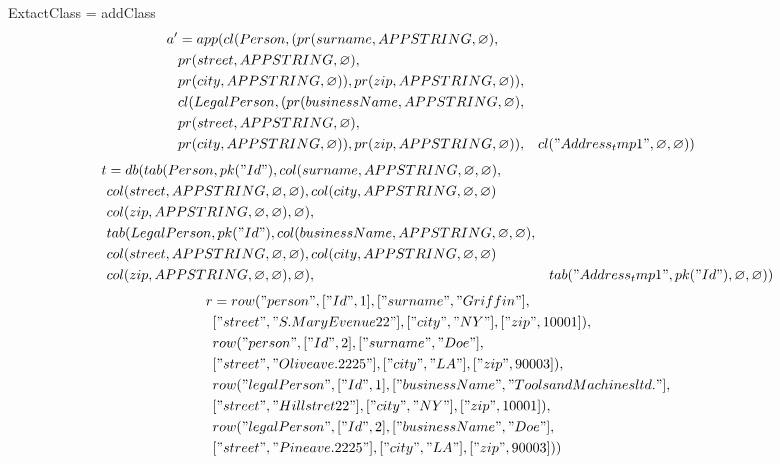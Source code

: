 \documentclass[11pt]{article}
\begin{document}
\newpage
ExtactClass = addClass
\begin{align*}
a' &= app(cl(Person, (pr(surname, APPSTRING, \varnothing), \\
& pr(street, APPSTRING, \varnothing), \\
& pr(city, APPSTRING, \varnothing)), pr(zip, APPSTRING, \varnothing)), \\
& cl(LegalPerson, (pr(businessName, APPSTRING, \varnothing), \\
& pr(street, APPSTRING, \varnothing), \\
& pr(city, APPSTRING, \varnothing)), pr(zip, APPSTRING, \varnothing)),
& cl("Address_tmp1", \varnothing, \varnothing)
& )
\end{align*}
\begin{align*}
t &= db(tab(Person, pk("Id"), col(surname, APPSTRING, \varnothing, \varnothing), \\
& col(street, APPSTRING, \varnothing, \varnothing), col(city, APPSTRING, \varnothing, \varnothing) \\
& col(zip, APPSTRING, \varnothing, \varnothing), \varnothing), \\
& tab(LegalPerson, pk("Id"),  col(businessName, APPSTRING, \varnothing, \varnothing), \\
& col(street, APPSTRING, \varnothing, \varnothing), col(city, APPSTRING, \varnothing, \varnothing) \\
& col(zip, APPSTRING, \varnothing, \varnothing), \varnothing),
& tab("Address_tmp1", pk("Id"), \varnothing, \varnothing)) 
\end{align*}
\begin{align*}
r &= row("person", ["Id", 1], ["surname", "Griffin"], \\
& ["street", "S. Mary Evenue 22"], ["city", "NY"], ["zip", 10001]), \\
& row("person", ["Id", 2], ["surname", "Doe"], \\
& ["street", "Olive ave. 2225"], ["city", "LA"], ["zip", 90003]), \\
& row("legalPerson", ["Id", 1], ["businessName", "Tools and Machines ltd."], \\
& ["street", "Hill stret 22"], ["city", "NY"], ["zip", 10001]), \\
& row("legalPerson", ["Id", 2], ["businessName", "Doe"], \\
& ["street", "Pine ave. 2225"], ["city", "LA"], ["zip", 90003]))
\end{align*}
\end{document}
